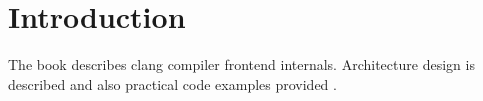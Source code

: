 \chapter{Introduction}

The book describes clang compiler frontend internals. Architecture
design is described and also practical code examples provided
\cite{github:clangbook_src}.
